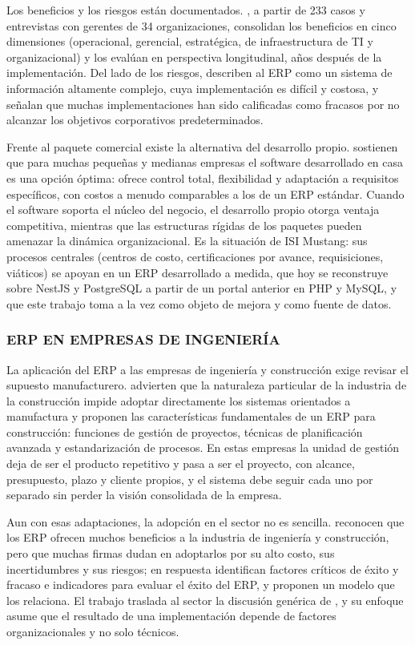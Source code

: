 Los beneficios y los riesgos están documentados. \textcite{Shang2002}, a partir de 233 casos y entrevistas con gerentes de 34 organizaciones, consolidan los beneficios en cinco dimensiones (operacional, gerencial, estratégica, de infraestructura de TI y organizacional) y los evalúan en perspectiva longitudinal, años después de la implementación. Del lado de los riesgos, \textcite{Umble2003} describen al ERP como un sistema de información altamente complejo, cuya implementación es difícil y costosa, y señalan que muchas implementaciones han sido calificadas como fracasos por no alcanzar los objetivos corporativos predeterminados.

Frente al paquete comercial existe la alternativa del desarrollo propio. \textcite{Olsen2007} sostienen que para muchas pequeñas y medianas empresas el software desarrollado en casa es una opción óptima: ofrece control total, flexibilidad y adaptación a requisitos específicos, con costos a menudo comparables a los de un ERP estándar. Cuando el software soporta el núcleo del negocio, el desarrollo propio otorga ventaja competitiva, mientras que las estructuras rígidas de los paquetes pueden amenazar la dinámica organizacional. Es la situación de ISI Mustang: sus procesos centrales (centros de costo, certificaciones por avance, requisiciones, viáticos) se apoyan en un ERP desarrollado a medida, que hoy se reconstruye sobre NestJS y PostgreSQL a partir de un portal anterior en PHP y MySQL, y que este trabajo toma a la vez como objeto de mejora y como fuente de datos.

\subsubsection{ERP EN EMPRESAS DE INGENIERÍA}

La aplicación del ERP a las empresas de ingeniería y construcción exige revisar el supuesto manufacturero. \textcite{Shi2003} advierten que la naturaleza particular de la industria de la construcción impide adoptar directamente los sistemas orientados a manufactura y proponen las características fundamentales de un ERP para construcción: funciones de gestión de proyectos, técnicas de planificación avanzada y estandarización de procesos. En estas empresas la unidad de gestión deja de ser el producto repetitivo y pasa a ser el proyecto, con alcance, presupuesto, plazo y cliente propios, y el sistema debe seguir cada uno por separado sin perder la visión consolidada de la empresa.

Aun con esas adaptaciones, la adopción en el sector no es sencilla. \textcite{Chung2008} reconocen que los ERP ofrecen muchos beneficios a la industria de ingeniería y construcción, pero que muchas firmas dudan en adoptarlos por su alto costo, sus incertidumbres y sus riesgos; en respuesta identifican factores críticos de éxito y fracaso e indicadores para evaluar el éxito del ERP, y proponen un modelo que los relaciona. El trabajo traslada al sector la discusión genérica de \textcite{Umble2003}, y su enfoque asume que el resultado de una implementación depende de factores organizacionales y no solo técnicos.

